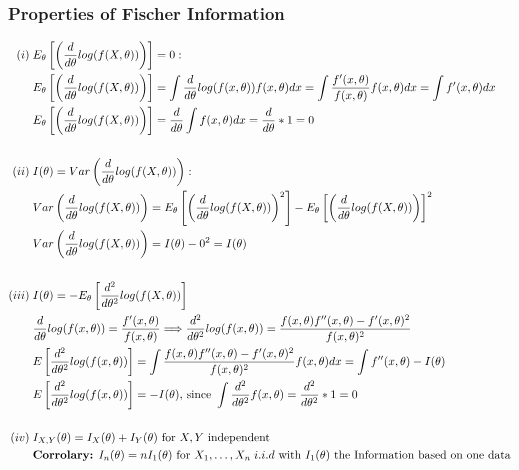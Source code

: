 \documentclass{article}
\begin{document}
\subsubsection{Properties of Fischer Information}
\begin{align*}
    (i) \; & E_\theta \left [ \left (\frac{d}{d\theta}log(f(X, \theta)) \right ) \right ] = 0:\\
    &  E_\theta \left [\left (\frac{d}{d\theta}log(f(X, \theta)) \right ) \right ] = 
    \int \frac{d}{d\theta}log(f(x, \theta))f(x, \theta)dx = \int \frac{f'(x, \theta)}{f(x, \theta)} f(x, \theta)dx =
    \int f'(x, \theta) dx\\
    & E_\theta \left [\left (\frac{d}{d\theta}log(f(X, \theta)) \right ) \right ] = \frac{d}{d\theta} \int f(x, \theta)dx =  \frac{d}{d\theta}*1 = 0\\ \\
    (ii) \; & I(\theta) = Var \left ( \frac{d}{d\theta}log(f(X, \theta)) \right ):\\
    & Var \left ( \frac{d}{d\theta}log(f(X, \theta)) \right ) = E_\theta \left [ \left (\frac{d}{d\theta}log(f(X, \theta)) \right )^2 \right ] - E_\theta \left [ \left (\frac{d}{d\theta}log(f(X, \theta)) \right ) \right ]^2\\
    & Var \left ( \frac{d}{d\theta}log(f(X, \theta)) \right ) = I(\theta) - 0^2 = I(\theta)\\ \\
    (iii) \; & I(\theta) = - E_\theta \left [\frac{d^2}{d\theta^2}log(f(X, \theta)) \right ]\\
    & \frac{d}{d\theta}log(f(x, \theta)) = \frac{f'(x, \theta)}{f(x, \theta)} \Longrightarrow \frac{d^2}{d\theta^2}log(f(x, \theta)) = \frac{f(x, \theta)f''(x, \theta) - f'(x, \theta)^2}{f(x, \theta)^2}\\
    & E\left [ \frac{d^2}{d\theta^2}log(f(x, \theta)) \right] = \int \frac{f(x, \theta)f''(x, \theta) - f'(x, \theta)^2}{f(x, \theta)^2}f(x, \theta)dx = \int f''(x, \theta) - I(\theta)\\
    & E\left [ \frac{d^2}{d\theta^2}log(f(x, \theta)) \right] = -I(\theta) \textrm{, since } \int \frac{d^2}{d\theta^2} f(x, \theta) = \frac{d^2}{d\theta^2} * 1 = 0\\ \\
    (iv) \; & I_{X, Y}(\theta) = I_X(\theta) + I_Y(\theta) \textrm{ for $X, Y$ independent}\\
    & \textrm{\textbf{Corrolary:} } I_n(\theta) = nI_1(\theta) \textrm{ for } X_1, \dots, X_n \; i.i.d \textrm{ with } I_{1}(\theta) \textrm{ the Information based on one data}\\ 

\end{align*}
\end{document}
